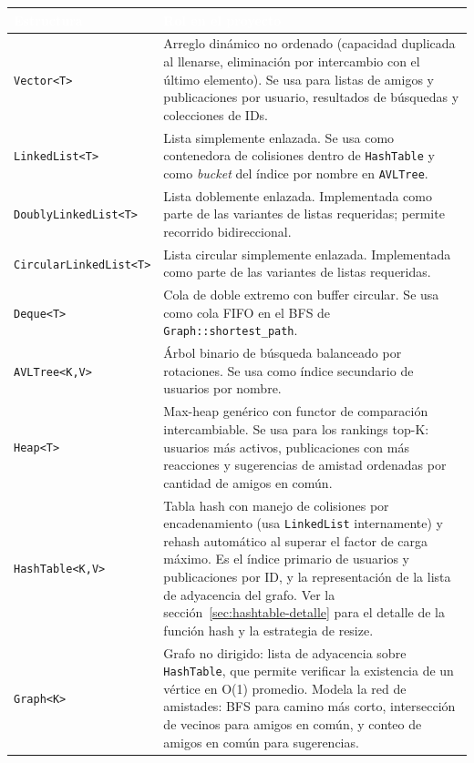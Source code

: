 \documentclass[11pt,a4paper]{article}
\begin{document}
\begin{center}
\begin{tabularx}{\textwidth}{@{}l X@{}}
\toprule
\rowcolor{tablehead}
\textcolor{white}{\textbf{Estructura}} & \textcolor{white}{\textbf{Rol en el proyecto}} \\
\midrule
\texttt{Vector<T>} &
Arreglo dinámico no ordenado (capacidad duplicada al llenarse,
eliminación por intercambio con el último elemento). Se usa para listas de
amigos y publicaciones por usuario, resultados de búsquedas y
colecciones de IDs. \\
\texttt{LinkedList<T>} &
Lista simplemente enlazada. Se usa como contenedora de colisiones dentro de
\texttt{HashTable} y como \emph{bucket} del índice por nombre en
\texttt{AVLTree}. \\
\texttt{DoublyLinkedList<T>} &
Lista doblemente enlazada. Implementada como parte de las variantes de
listas requeridas; permite recorrido bidireccional. \\
\texttt{CircularLinkedList<T>} &
Lista circular simplemente enlazada. Implementada como parte de las
variantes de listas requeridas. \\
\texttt{Deque<T>} &
Cola de doble extremo con buffer circular. Se usa como cola FIFO en el
BFS de \texttt{Graph::shortest\_path}. \\
\texttt{AVLTree<K,V>} &
Árbol binario de búsqueda balanceado por rotaciones. Se usa como índice
secundario de usuarios por nombre. \\
\texttt{Heap<T>} &
Max-heap genérico con functor de comparación intercambiable. Se usa para
los rankings top-K: usuarios más activos, publicaciones con más
reacciones y sugerencias de amistad ordenadas por cantidad de amigos en
común. \\
\texttt{HashTable<K,V>} &
Tabla hash con manejo de colisiones por encadenamiento (usa
\texttt{LinkedList} internamente) y rehash automático al superar el
factor de carga máximo. Es el índice primario de usuarios y
publicaciones por ID, y la representación de la lista de adyacencia del
grafo. Ver la sección~\ref{sec:hashtable-detalle} para el detalle de
la función hash y la estrategia de resize. \\
\texttt{Graph<K>} &
Grafo no dirigido: lista de adyacencia sobre \texttt{HashTable}, que
permite verificar la existencia de un vértice en O(1) promedio. Modela
la red de amistades: BFS para camino más corto, intersección de vecinos
para amigos en común, y conteo de amigos en común para sugerencias. \\
\bottomrule
\end{tabularx}
\end{center}
\end{document}
